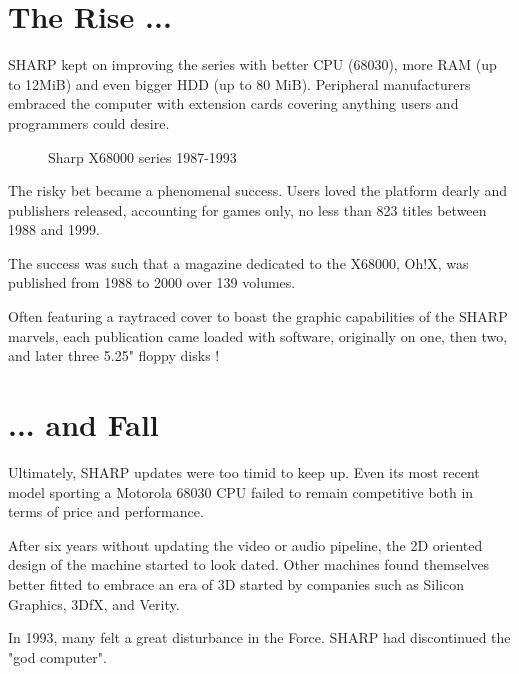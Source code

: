 \section{The Rise ...}
 SHARP kept on improving the series with better CPU (68030), more RAM (up to 12MiB) and even bigger HDD (up to 80 MiB). Peripheral manufacturers embraced the computer with extension cards covering anything users and programmers could desire. 


\begin{figure}[H]
\caption*{Sharp X68000 series 1987-1993}
\end{figure}






 The risky bet became a phenomenal success. Users loved the platform dearly and publishers released, accounting for games only, no less than 823 titles between 1988 and 1999.


\begin{trivia}
The success was such that a magazine dedicated to the X68000, Oh!X, was published from 1988 to 2000 over 139 volumes. 

\begin{minipage}[t]{0.32\linewidth}
\end{minipage}%
\hfill
\begin{minipage}[t]{0.32\linewidth}
\end{minipage}%
\hfill
\begin{minipage}[t]{0.322\linewidth}
\end{minipage}%

Often featuring a raytraced cover to boast the graphic capabilities of the SHARP marvels, each publication came loaded with software, originally on one, then two, and later three 5.25" floppy disks \cite{ohXarticle}!
\end{trivia}

\section{... and Fall}
Ultimately, SHARP updates were too timid to keep up. Even its most recent model sporting a Motorola 68030 CPU failed to remain competitive both in terms of price and performance.

After six years without updating the video or audio pipeline, the 2D oriented design of the machine started to look dated. Other machines found themselves better fitted to embrace an era of 3D started by companies such as Silicon Graphics, 3DfX, and Verity.

In 1993, many felt a great disturbance in the Force. SHARP had discontinued the "god computer".

